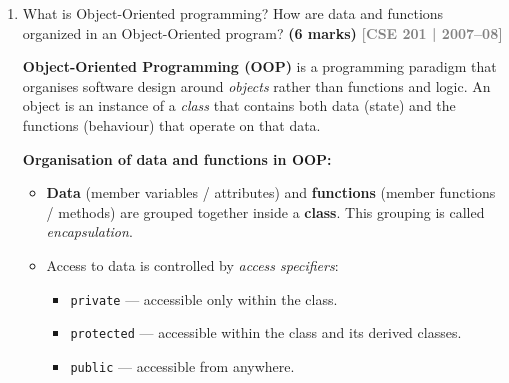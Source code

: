 \documentclass[12pt,a3paper]{article}
\newcommand{\yr}[1]{\hfill\textcolor{gray}{\small\textbf{[#1]}}}
\newcommand{\mk}[1]{\textcolor{orange!70!black}{\small\textbf{(#1 marks)}}}
\begin{document}
\begin{enumerate}
\begin{tcolorbox}[enhanced,breakable,ansbox,colback=cA!4,colframe=cA,
  boxrule=0.8pt,arc=5pt,
  title={\textbf{Answer}},fonttitle=\bfseries\color{white},colbacktitle=cA]
\medskip
\textbf{Run-Time Polymorphism (Dynamic Polymorphism):}

Resolved while the program is running, based on the actual type of
the object.  Achieved through \texttt{virtual} functions and base
class pointers/references.

\begin{lstlisting}[language=C++]
class Shape {
public:
    virtual double area() const = 0;  // pure virtual
};
class Circle : public Shape {
    double r;
public:
    Circle(double r) : r(r) {}
    double area() const override { return 3.14159 * r * r; }
};
class Rectangle : public Shape {
    double l, w;
public:
    Rectangle(double l, double w) : l(l), w(w) {}
    double area() const override { return l * w; }
};

Shape* s1 = new Circle(3.0);
Shape* s2 = new Rectangle(4.0, 6.0);
cout << s1->area();   // calls Circle::area() at run time
cout << s2->area();   // calls Rectangle::area() at run time
\end{lstlisting}

\end{tcolorbox}

\item What is Object-Oriented programming? How are data and functions organized in an Object-Oriented program? \mk{6}
\yr{CSE 201 | 2007--08}

\begin{tcolorbox}[enhanced,breakable,ansbox,colback=cA!4,colframe=cA,
  boxrule=0.8pt,arc=5pt,
  title={\textbf{Answer}},fonttitle=\bfseries\color{white},colbacktitle=cA]

\textbf{Object-Oriented Programming (OOP)} is a programming paradigm
that organises software design around \emph{objects} rather than
functions and logic.  An object is an instance of a \emph{class} that
contains both data (state) and the functions (behaviour) that operate
on that data.

\medskip
\textbf{Organisation of data and functions in OOP:}

\begin{itemize}[itemsep=3pt]
  \item \textbf{Data} (member variables / attributes) and
    \textbf{functions} (member functions / methods) are grouped
    together inside a \textbf{class}.  This grouping is called
    \emph{encapsulation}.

  \item Access to data is controlled by \emph{access specifiers}:
    \begin{itemize}
      \item \texttt{private} --- accessible only within the class.
      \item \texttt{protected} --- accessible within the class and
        its derived classes.
      \item \texttt{public} --- accessible from anywhere.
    \end{itemize}


\end{itemize}
\end{tcolorbox}
\end{enumerate}
\end{document}
